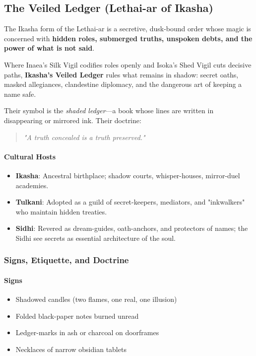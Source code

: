 \documentclass[11pt]{book}
\begin{document}
\subsection{The Veiled Ledger (Lethai-ar of Ikasha)}

The Ikasha form of the Lethai-ar is a secretive, dusk-bound order whose magic is concerned with
\textbf{hidden roles, submerged truths, unspoken debts, and the power of what is not said}.  

Where Inaea's Silk Vigil codifies roles openly and Isoka's Shed Vigil cuts decisive paths,
\textbf{Ikasha's Veiled Ledger} rules what remains in shadow:  
secret oaths, masked allegiances, clandestine diplomacy, and the dangerous art of keeping a name safe.

Their symbol is the \emph{shaded ledger}---a book whose lines are written in disappearing or mirrored ink.
Their doctrine:  
\begin{quote}
    \emph{"A truth concealed is a truth preserved."}
\end{quote}

\paragraph{Cultural Hosts}
\begin{itemize}[leftmargin=*]
    \item \textbf{Ikasha}: Ancestral birthplace; shadow courts, whisper-houses, mirror-duel academies.
    \item \textbf{Tulkani}: Adopted as a guild of secret-keepers, mediators, and "inkwalkers" who maintain hidden treaties.
    \item \textbf{Sidhi}: Revered as dream-guides, oath-anchors, and protectors of names; the Sidhi see secrets as essential architecture of the soul.
\end{itemize}

\subsubsection{Signs, Etiquette, and Doctrine}

\paragraph{Signs}
\begin{itemize}[leftmargin=*]
    \item Shadowed candles (two flames, one real, one illusion)
    \item Folded black-paper notes burned unread
    \item Ledger-marks in ash or charcoal on doorframes
    \item Necklaces of narrow obsidian tablets
\end{itemize}
\end{document}
